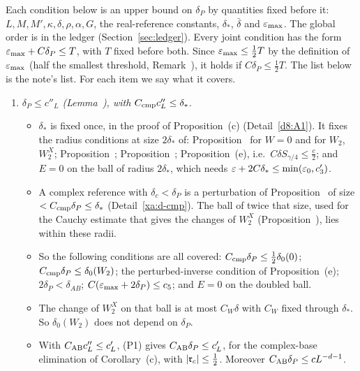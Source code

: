 \begin{detail}\label{xa:d-deltaP}
Each condition below is an upper bound on $\delta_P$ by quantities fixed before it: $L,M,M',\kappa,\delta,\rho,\alpha,G$, the real-reference constants, $\delta_*$, $\bar\delta$ and $\varepsilon_{\max}$. The global order is in the ledger (Section~\ref{sec:ledger}). Every joint condition has the form $\varepsilon_{\max}+C\delta_P\le T$, with $T$ fixed before both. Since $\varepsilon_{\max}\le\frac12T$ by the definition of $\varepsilon_{\max}$ (half the smallest threshold, Remark~), it holds if $C\delta_P\le\frac12T$. The list below is the note's list. For each item we say what it covers.
\begin{enumerate}[label=(P\arabic*)]
\item \emph{$\delta_P\le c''_L$ (Lemma~), with $C_{\rm cmp}c''_L\le\delta_*$.}
  \begin{itemize}
  \item $\delta_*$ is fixed once, in the proof of Proposition~(c) (Detail~\ref{d8:A1}). It fixes the radius conditions at size $2\delta_*$ of: Proposition~ for $W=0$ and for $W_2$, $W_2^X$; Proposition~; Proposition~; Proposition~(e), i.e.\ $C\delta S_{\gamma/4}\le\frac c2$; and $E=0$ on the ball of radius $2\delta_*$, which needs $\varepsilon+2C\delta_*\le\min(\varepsilon_0,c'_3)$.
  \item A complex reference with $\delta_c<\delta_P$ is a perturbation of Proposition~ of size $<C_{\rm cmp}\delta_P\le\delta_*$ (Detail~\ref{xa:d-cmp}). The ball of twice that size, used for the Cauchy estimate that gives the changes of $W_2^X$ (Proposition~), lies within these radii.
  \item So the following conditions are all covered: $C_{\rm cmp}\delta_P\le\frac12\delta_0(0)$; $C_{\rm cmp}\delta_P\le\delta_0(W_2)$; the perturbed-inverse condition of Proposition~(e); $2\delta_P<\delta_{AB}$; $C(\varepsilon_{\max}+2\delta_P)\le c_5$; and $E=0$ on the doubled ball.
  \item The change of $W_2^X$ on that ball is at most $C_W\delta$ with $C_W$ fixed through $\delta_*$. So $\delta_0(W_2)$ does not depend on $\delta_P$.
  \item With $C_{\rm AB}c''_L\le c'_L$, (P1) gives $C_{\rm AB}\delta_P\le c'_L$, for the complex-base elimination of Corollary~(c), with $\lvert\mathfrak r_c\rvert\le\frac12$. Moreover $C_{\rm AB}\delta_P\le cL^{-d-1}$.

\end{itemize}
\end{enumerate}
\end{detail}

